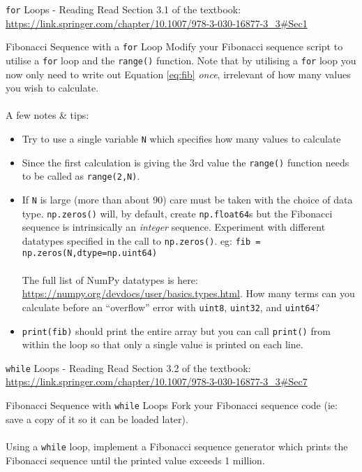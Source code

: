 \documentclass{lab}
\begin{document}
\begin{task}{\texttt{for} Loops - Reading}{}
Read Section 3.1 of the textbook: \url{https://link.springer.com/chapter/10.1007/978-3-030-16877-3_3#Sec1}
\end{task}

\begin{task}{Fibonacci Sequence with a \texttt{for} Loop}{}
Modify your Fibonacci sequence script to utilise a \texttt{for} loop and the \texttt{range()} function. Note that by utilising a \texttt{for} loop you now only need to write out Equation \ref{eq:fib} \textit{once}, irrelevant of how many values you wish to calculate.
\\~\\
A few notes \& tips:
\begin{itemize}
\item Try to use a single variable \texttt{N} which specifies how many values to calculate
\item Since the first calculation is giving the 3rd value the \texttt{range()} function needs to be called as \texttt{range(2,N)}.
\item If \texttt{N} is large (more than about 90) care must be taken with the choice of data type. \texttt{np.zeros()} will, by default, create \texttt{np.float64}s but the Fibonacci sequence is intrinsically an \textit{integer} sequence. Experiment with different datatypes specified in the call to \texttt{np.zeros()}. eg: \texttt{fib = np.zeros(N,dtype=np.uint64)}\\~\\The full list of NumPy datatypes is here: \url{https://numpy.org/devdocs/user/basics.types.html}. How many terms can you calculate before an ``overflow'' error with \texttt{uint8}, \texttt{uint32}, and \texttt{uint64}?
\item \texttt{print(fib)} should print the entire array but you can call \texttt{print()} from within the loop so that only a single value is printed on each line.
\end{itemize}
\end{task}

\begin{task}{\texttt{while} Loops - Reading}{}
Read Section 3.2 of the textbook: \url{https://link.springer.com/chapter/10.1007/978-3-030-16877-3_3#Sec7}
\end{task}

\begin{task}{Fibonacci Sequence with \texttt{while} Loops}{}
Fork your Fibonacci sequence code (ie: save a copy of it so it can be loaded later).
\\~\\
Using a \texttt{while} loop, implement a Fibonacci sequence generator which prints the Fibonacci sequence until the printed value exceeds 1 million.
\end{task}
\end{document}

